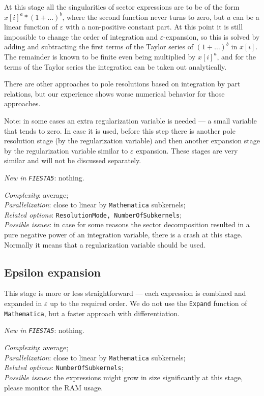 \documentclass[preprint,12pt]{elsarticle}
\newcommand{\ep}{\varepsilon}
\begin{document}
At this stage all the singularities of sector expressions are to be of the form $x[i]^{a} * (1 + \ldots )^b$, 
where the second function never turns to zero, but $a$ can be a linear function of $\ep$ with a non-positive constant part. At this point it is still impossible to change the order of integration and $\ep$-expansion, so this is solved by adding and subtracting the first terms of the Taylor series of $(1 + \ldots )^b$ in $x[i]$. The remainder is known to be finite even being multiplied by $x[i]^{a}$, and for the terms of the Taylor series the integration can be taken out analytically. 

There are other approaches to pole resolutions based on integration by part relations, but our experience shows worse numerical behavior for those approaches.

Note: in some cases an extra regularization variable is needed --- a small variable that tends to zero. In case it is used, before this step there is another pole resolution stage (by the regularization variable) and then another expansion stage by the regularization variable similar to $\ep$ expansion. These stages are very similar and will not be discussed separately.

\textit{New in {\tt FIESTA5}}: nothing.

\textit{Complexity}: average;\\\indent
\textit{Parallelization}: close to linear by {\tt Mathematica} subkernels;\\\indent
\textit{Related options}: {\tt ResolutionMode, NumberOfSubkernels};\\\indent
\textit{Possible issues}: in case for some reasons the sector decomposition resulted in a pure negative power of an integration variable, there is a crash at this stage. Normally it means that a regularization variable should be used.

\subsection{Epsilon expansion}

This stage is more or less straightforward --- each expression is combined and expanded in $\ep$ up to the required order. We do not use the {\tt Expand} function of {\tt Mathematica}, but a faster approach with differentiation.

\textit{New in {\tt FIESTA5}}: nothing.

\textit{Complexity}: average;\\\indent
\textit{Parallelization}: close to linear by {\tt Mathematica} subkernels;\\\indent
\textit{Related options}: {\tt NumberOfSubkernels};\\\indent
\textit{Possible issues}: the expressions might grow in size significantly at this stage, please monitor the RAM usage.
\end{document}
